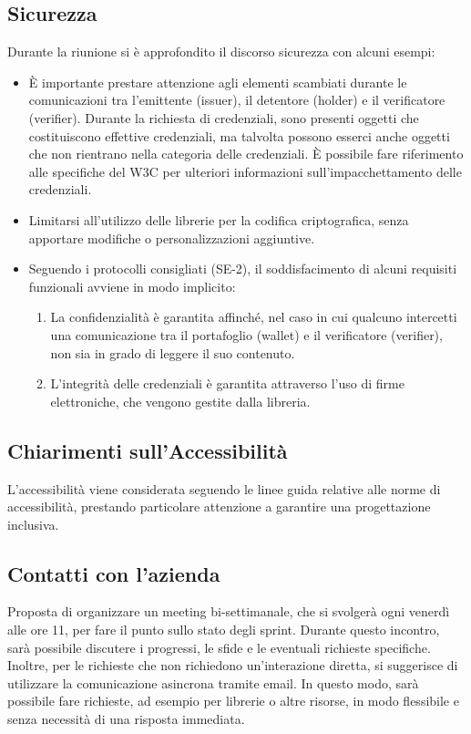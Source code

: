 \subsection{Sicurezza}
Durante la riunione si è approfondito il discorso sicurezza con alcuni esempi:
\begin{itemize}
    \item È importante prestare attenzione agli elementi scambiati durante le comunicazioni tra l'emittente (issuer), il detentore (holder) e il verificatore (verifier).
     Durante la richiesta di credenziali, sono presenti oggetti che costituiscono effettive credenziali, ma talvolta possono esserci anche oggetti che non rientrano nella categoria delle credenziali. È possibile fare riferimento alle specifiche del W3C per ulteriori informazioni sull'impacchettamento delle credenziali.
    \item Limitarsi all'utilizzo delle librerie per la codifica criptografica, senza apportare modifiche o personalizzazioni aggiuntive.
    \item Seguendo i protocolli consigliati (SE-2), il soddisfacimento di alcuni requisiti funzionali avviene in modo implicito:
      \begin{enumerate}
        \item La confidenzialità è garantita affinché, nel caso in cui qualcuno intercetti una comunicazione tra il portafoglio (wallet) e il verificatore (verifier), non sia in grado di leggere il suo contenuto.
        \item L'integrità delle credenziali è garantita attraverso l'uso di firme elettroniche, che vengono gestite dalla libreria.
      \end{enumerate}
   
\end{itemize}


\subsection{Chiarimenti sull'Accessibilità}
L'accessibilità viene considerata seguendo le linee guida relative alle norme di accessibilità, prestando particolare attenzione a garantire una progettazione inclusiva.

\subsection{Contatti con l'azienda}

Proposta di organizzare un meeting bi-settimanale, che si svolgerà ogni venerdì alle ore 11, per fare il punto sullo stato degli sprint. Durante questo incontro, sarà possibile discutere i progressi,
 le sfide e le eventuali richieste specifiche. Inoltre, per le richieste che non richiedono un'interazione diretta, si suggerisce di utilizzare la comunicazione asincrona tramite email. In questo modo, sarà possibile fare richieste, ad esempio per librerie o altre risorse, in modo flessibile e senza necessità di una risposta immediata.

